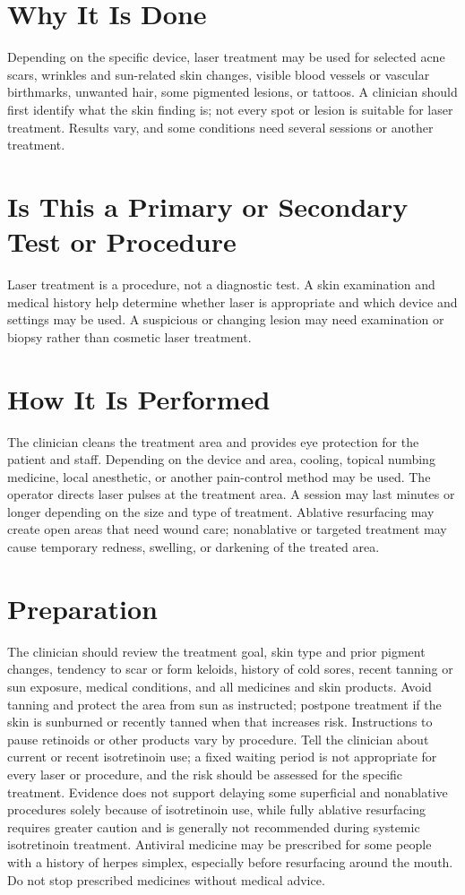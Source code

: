 \section*{Why It Is Done}
Depending on the specific device, laser treatment may be used for selected acne scars, wrinkles and sun-related skin changes, visible blood vessels or vascular birthmarks, unwanted hair, some pigmented lesions, or tattoos. A clinician should first identify what the skin finding is; not every spot or lesion is suitable for laser treatment. Results vary, and some conditions need several sessions or another treatment.

\section*{Is This a Primary or Secondary Test or Procedure}
Laser treatment is a procedure, not a diagnostic test. A skin examination and medical history help determine whether laser is appropriate and which device and settings may be used. A suspicious or changing lesion may need examination or biopsy rather than cosmetic laser treatment.

\section*{How It Is Performed}
The clinician cleans the treatment area and provides eye protection for the patient and staff. Depending on the device and area, cooling, topical numbing medicine, local anesthetic, or another pain-control method may be used. The operator directs laser pulses at the treatment area. A session may last minutes or longer depending on the size and type of treatment. Ablative resurfacing may create open areas that need wound care; nonablative or targeted treatment may cause temporary redness, swelling, or darkening of the treated area.

\section*{Preparation}
The clinician should review the treatment goal, skin type and prior pigment changes, tendency to scar or form keloids, history of cold sores, recent tanning or sun exposure, medical conditions, and all medicines and skin products. Avoid tanning and protect the area from sun as instructed; postpone treatment if the skin is sunburned or recently tanned when that increases risk. Instructions to pause retinoids or other products vary by procedure. Tell the clinician about current or recent isotretinoin use; a fixed waiting period is not appropriate for every laser or procedure, and the risk should be assessed for the specific treatment. Evidence does not support delaying some superficial and nonablative procedures solely because of isotretinoin use, while fully ablative resurfacing requires greater caution and is generally not recommended during systemic isotretinoin treatment. Antiviral medicine may be prescribed for some people with a history of herpes simplex, especially before resurfacing around the mouth. Do not stop prescribed medicines without medical advice.

